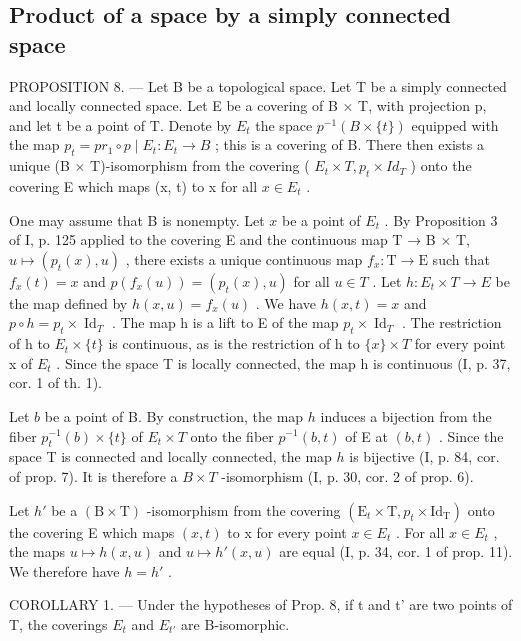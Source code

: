 \subsection{Product of a space by a simply connected space}

PROPOSITION 8. --- Let B be a topological space. Let T be a simply connected and locally connected space. Let E be a covering of B × T, with projection p, and let t be a point of T. Denote by \(E_{t}\) the space \(p^{-1}(B \times \{t\})\) equipped with the map \(p_{t} = pr_{1} \circ p \mid E_{t}: E_{t} \to B\) ; this is a covering of B. There then exists a unique (B × T)-isomorphism from the covering ( \(E_{t} \times T, p_{t} \times Id_{T}\) ) onto the covering E which maps (x, t) to x for all \(x \in E_{t}\) .

One may assume that B is nonempty. Let \(x\) be a point of \(E_t\) . By Proposition 3 of I, p. 125 applied to the covering E and the continuous map T → B × T, \(u \mapsto (p_t(x), u)\) , there exists a unique continuous map \(f_x \colon \mathrm{T} \to \mathrm{E}\) such that \(f_x(t) = x\) and \(p(f_x(u)) = (p_t(x), u)\) for all \(u \in T\) . Let \(h \colon E_t \times T \to E\) be the map defined by \(h(x, u) = f_x(u)\) . We have \(h(x, t) = x\) and \(p \circ h = p_t \times \operatorname{Id}_T\) . The map h is a lift to E of the map \(p_t \times \operatorname{Id}_T\) . The restriction of h to \(E_t \times \{t\}\) is continuous, as is the restriction of h to \(\{x\} \times T\) for every point x of \(E_t\) . Since the space T is locally connected, the map h is continuous (I, p. 37, cor. 1 of th. 1).

Let \(b\) be a point of B. By construction, the map \(h\) induces a bijection from the fiber \(p_t^{-1}(b) \times \{t\}\) of \(E_t \times T\) onto the fiber \(p^{-1}(b,t)\) of E at \((b,t)\) . Since the space T is connected and locally connected, the map \(h\) is bijective (I, p. 84, cor. of prop. 7). It is therefore a \(B \times T\) -isomorphism (I, p. 30, cor. 2 of prop. 6).

Let \(h'\) be a \((\mathrm{B} \times \mathrm{T})\) -isomorphism from the covering \((\mathrm{E}_{t} \times \mathrm{T}, p_{t} \times \mathrm{Id}_{\mathrm{T}})\) onto the covering E which maps \((x, t)\) to x for every point \(x \in E_{t}\) . For all \(x \in E_{t}\) , the maps \(u \mapsto h(x, u)\) and \(u \mapsto h'(x, u)\) are equal (I, p. 34, cor. 1 of prop. 11). We therefore have \(h = h'\) .

COROLLARY 1. --- Under the hypotheses of Prop. 8, if t and t' are two points of T, the coverings \(E_{t}\) and \(E_{t'}\) are B-isomorphic.

